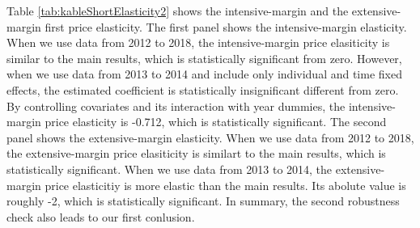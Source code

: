 \documentclass[ review  , 3p ]{elsarticle}
\begin{document}
  Table \ref{tab:kableShortElasticity2} shows the intensive-margin and the extensive-margin first price elasticity.
  The first panel shows the intensive-margin elasticity.
  When we use data from 2012 to 2018, the intensive-margin price elasiticity is similar to the main results,
  which is statistically significant from zero.
  However, when we use data from 2013 to 2014 and include only individual and time fixed effects,
  the estimated coefficient is statistically insignificant different from zero.
  By controlling covariates and its interaction with year dummies,
  the intensive-margin price elasticity is -0.712, which is statistically significant.
  The second panel shows the extensive-margin elasticity.
  When we use data from 2012 to 2018, the extensive-margin price elasiticity is similart to the main results,
  which is statistically significant.
  When we use data from 2013 to 2014, the extensive-margin price elasticitiy is more elastic than the main results.
  Its abolute value is roughly -2, which is statistically significant.
  In summary, the second robustness check also leads to our first conlusion.
\end{document}
